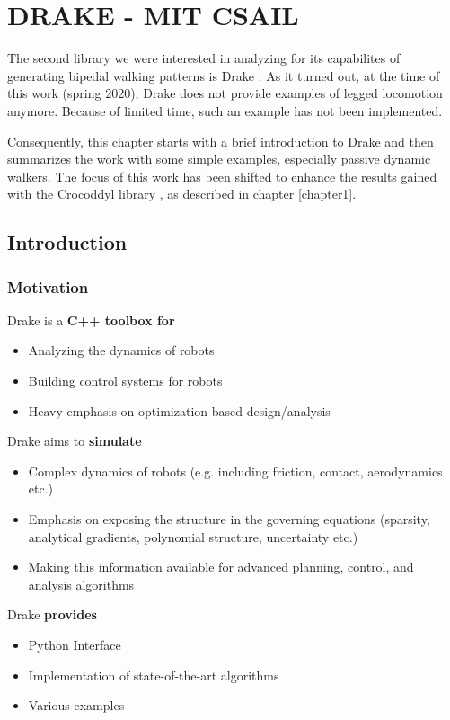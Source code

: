 \chapter{DRAKE - MIT CSAIL}
The second library we were interested in analyzing for its capabilites of generating bipedal walking patterns is Drake \cite{drake}. As it turned out, at the time of this work (spring 2020), Drake does not provide examples of legged locomotion anymore.  Because of limited time, such an example has not been implemented.

Consequently, this chapter starts with a brief introduction to Drake and then summarizes the work with some simple examples, especially passive dynamic walkers. The focus of this work has been shifted to enhance the results gained with the Crocoddyl library , as described in chapter \ref{chapter1}.  


\section{Introduction}
\subsection{Motivation}
Drake is a \textbf{C++ toolbox for}
\begin{itemize}
\item Analyzing the dynamics of robots
\item Building control systems for robots
\item Heavy emphasis on optimization-based design/analysis
\end{itemize}

Drake aims to \textbf{simulate} 
\begin{itemize}
\item Complex dynamics of robots (e.g. including friction, contact, aerodynamics etc.)
\item Emphasis on exposing the structure in the governing equations (sparsity, analytical gradients, polynomial structure, uncertainty etc.)
\item Making this information available for advanced planning, control, and analysis algorithms
\end{itemize}

Drake \textbf{provides}
\begin{itemize}
\item Python Interface
\item Implementation of state-of-the-art algorithms
\item Various examples
\end{itemize}

